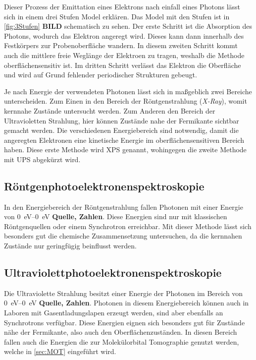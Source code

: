         Dieser Prozess der Emittation eines Elektrons nach einfall eines Photons lässt sich in einem drei Stufen Model erklären.
        Das Model mit den Stufen ist in \autoref{fig:3Stufen} \textbf{BILD} schematisch zu sehen.
        Der erste Schritt ist die Absorption des Photons, wodurch das Elektron angeregt wird. 
        Dieses kann dann innerhalb des Festkörpers zur Probenoberfläche wandern.
        In diesem zweiten Schritt kommt auch die mittlere freie Weglänge der Elektroen zu tragen, weshalb die Methode oberflächensensitiv ist.
        Im dritten Schritt verlässt das Elektron die Oberfläche und wird auf Grund fehlender periodischer Strukturen gebeugt.

        Je nach Energie der verwendeten Photonen lässt sich in maßgeblich zwei Bereiche unterscheiden.
        Zum Einen in den Bereich der Röntgenstrahlung (\textit{X-Ray}), womit kernnahe Zustände untersucht werden.
        Zum Anderen den Bereich der Ultravioletten Strahlung, hier können Zustände nahe der Fermikante sichtbar gemacht werden.
        Die verschiedenen Energiebereich sind notwendig, damit die angeregten Elektronen eine kinetische Energie im oberflächensensitiven Bereich haben.
        Diese erste Methode wird XPS genannt, wohingegen die zweite Methode mit UPS abgekürzt wird.

        \subsection{Röntgenphotoelektronenspektroskopie}
            In den Energiebereich der Röntgenstrahlung fallen Photonen mit einer Energie von \SIrange{0}{0}{\electronvolt} \textbf{Quelle, Zahlen}.
            Diese Energien sind nur mit klassischen Röntgenquellen oder einem Synchrotron erreichbar.
            Mit dieser Methode lässt sich besonders gut die chemische Zusammensetzung untersuchen, da die kernnahen Zustände nur geringfügig beinflusst werden.

        \subsection{Ultraviolettphotoelektronenspektroskopie}
            Die Ultraviolette Strahlung besitzt einer Energie der Photonen im Bereich von \SIrange{0}{0}{\electronvolt} \textbf{Quelle, Zahlen}.
            Photonen in diesem Energiebereich können auch in Laboren mit Gasentladungslapen erzeugt werden, sind aber ebenfalls an Synchrotrons verfügbar.
            Diese Energien eignen sich besonders gut für Zustände nähe der Fermikante, also auch den Oberflächenzuständen.
            In diesen Bereich fallen auch die Energien die zur Molekülorbital Tomographie genutzt werden, welche in \autoref{sec:MOT} eingeführt wird.

